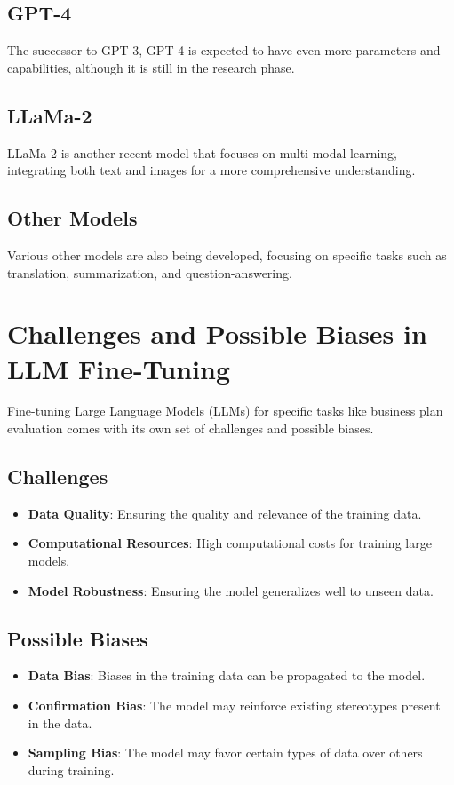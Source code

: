 \documentclass[12pt]{article}
\begin{document}
	\subsection{GPT-4}
	The successor to GPT-3, GPT-4 is expected to have even more parameters and capabilities, although it is still in the research phase\cite{gpt4}.
	
	\subsection{LLaMa-2}
	LLaMa-2 is another recent model that focuses on multi-modal learning, integrating both text and images for a more comprehensive understanding\cite{llama2}.
	
	\subsection{Other Models}
	Various other models are also being developed, focusing on specific tasks such as translation, summarization, and question-answering\cite{othermodels}.
	
	\section{Challenges and Possible Biases in LLM Fine-Tuning}
	
	Fine-tuning Large Language Models (LLMs) for specific tasks like business plan evaluation comes with its own set of challenges and possible biases.
	
	\subsection{Challenges}
	\begin{itemize}
		\item \textbf{Data Quality}: Ensuring the quality and relevance of the training data.
		\item \textbf{Computational Resources}: High computational costs for training large models.
		\item \textbf{Model Robustness}: Ensuring the model generalizes well to unseen data.
	\end{itemize}
	
	\subsection{Possible Biases}
	\begin{itemize}
		\item \textbf{Data Bias}: Biases in the training data can be propagated to the model.
		\item \textbf{Confirmation Bias}: The model may reinforce existing stereotypes present in the data.
		\item \textbf{Sampling Bias}: The model may favor certain types of data over others during training.
	\end{itemize}
	
\end{document}
